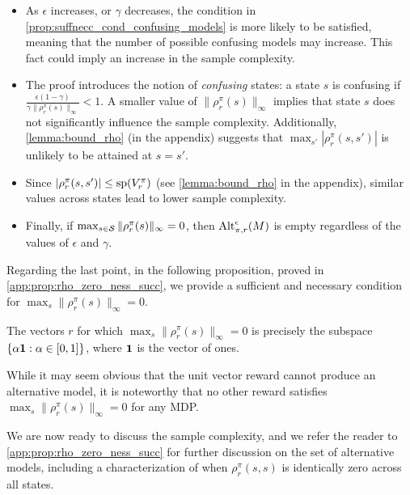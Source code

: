 \begin{itemize}
    \item  As $\epsilon$ increases, or $\gamma$ decreases, the condition in \cref{prop:suffnecc_cond_confusing_models} is  more likely to be satisfied, meaning that  the number of possible confusing models may increase. This fact could imply an increase in the sample complexity.
    
    \item The proof introduces the notion of \emph{confusing} states: a state $s$ is confusing if
    $
        \frac{\epsilon(1 - \gamma)}{\gamma \|\rho_r^\pi(s)\|_\infty} < 1
    $. A smaller value of $\|\rho_r^\pi(s)\|_\infty$ implies that state $s$ does not significantly influence the sample complexity. Additionally, \cref{lemma:bound_rho} (in the appendix) suggests that $\max_{s'} |\rho_r^\pi(s,s')|$ is unlikely to be attained at $s=s'$.
\item 
Since $|\rho_r^\pi(s,s')|\leq {\rm sp}(V_r^\pi)$ (see \cref{lemma:bound_rho} in the appendix),  similar values across states lead to lower sample complexity.

    
    \item Finally, if $\max_{s\in {\cal S}}\|\rho_{r}^\pi(s)\|_\infty = 0$, then ${\rm Alt}_{\pi,r}^\epsilon(M)$ is empty regardless of the values of $\epsilon$ and $\gamma$.
\end{itemize}

Regarding the last point, in the following proposition, proved in \cref{app:prop:rho_zero_ness_succ}, we provide a sufficient and necessary condition for $\max_s\|\rho_r^\pi(s)\|_\infty=0$.

\begin{tcolorbox}
\begin{proposition}\label{prop:rho_zero_ness_succ}
    The vectors $r$ for which $\max_{s} \|\rho_r^\pi(s)\|_\infty=0$ is precisely the subspace $\{\alpha {\bf 1} : \alpha \in [0,1]\}$, where ${\bf 1}$ is the vector of ones. 
\end{proposition}
\end{tcolorbox}
While it may seem obvious that the unit vector reward cannot produce an alternative model, it is noteworthy  that no other reward satisfies $\max_{s} \|\rho_r^\pi(s)\|_\infty=0$ for any MDP.

We are now ready to discuss the sample complexity, and we refer the reader to \cref{app:prop:rho_zero_ness_succ} for further discussion on the set of alternative models, including a characterization of when $\rho_r^\pi(s,s)$ is identically zero across all states. 



